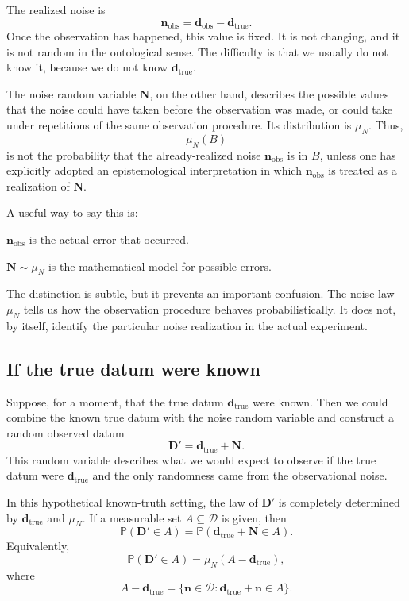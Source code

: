 \documentclass[11pt]{article}
\newcommand{\Dspace}{\mathcal D}
\newcommand{\muN}{\mu_N}
\newcommand{\Dobsrand}{\mathbf D'}
\newcommand{\Nrand}{\mathbf N}
\newcommand{\dtrue}{\mathbf d_{\mathrm{true}}}
\newcommand{\dobs}{\mathbf d_{\mathrm{obs}}}
\newcommand{\nobs}{\mathbf n_{\mathrm{obs}}}
\newcommand{\Prob}{\mathbb P}
\begin{document}
The realized noise is
\[
    \nobs=\dobs-\dtrue.
\]
Once the observation has happened, this value is fixed. It is not changing, and it is not random in the ontological sense. The difficulty is that we usually do not know it, because we do not know \(\dtrue\).

The noise random variable \(\Nrand\), on the other hand, describes the possible values that the noise could have taken before the observation was made, or could take under repetitions of the same observation procedure. Its distribution is \(\muN\). Thus,
\[
    \muN(B)
\]
is not the probability that the already-realized noise \(\nobs\) is in \(B\), unless one has explicitly adopted an epistemological interpretation in which \(\nobs\) is treated as a realization of \(\Nrand\).

A useful way to say this is:
\begin{description}[leftmargin=2.8cm,style=nextline]
    \item[Ontological noise.]
    \(\nobs\) is the actual error that occurred.

    \item[Epistemological noise model.]
    \(\Nrand\sim\muN\) is the mathematical model for possible errors.
\end{description}

The distinction is subtle, but it prevents an important confusion. The noise law \(\muN\) tells us how the observation procedure behaves probabilistically. It does not, by itself, identify the particular noise realization in the actual experiment.

\subsection{If the true datum were known}

Suppose, for a moment, that the true datum \(\dtrue\) were known. Then we could combine the known true datum with the noise random variable and construct a random observed datum
\[
    \Dobsrand=\dtrue+\Nrand.
\]
This random variable describes what we would expect to observe if the true datum were \(\dtrue\) and the only randomness came from the observational noise.

In this hypothetical known-truth setting, the law of \(\Dobsrand\) is completely determined by \(\dtrue\) and \(\muN\). If a measurable set \(A\subseteq\Dspace\) is given, then
\[
    \Prob(\Dobsrand\in A)
    =
    \Prob(\dtrue+\Nrand\in A).
\]
Equivalently,
\[
    \Prob(\Dobsrand\in A)
    =
    \muN(A-\dtrue),
\]
where
\[
    A-\dtrue
    =
    \{\mathbf n\in\Dspace:\dtrue+\mathbf n\in A\}.
\]
\end{document}
